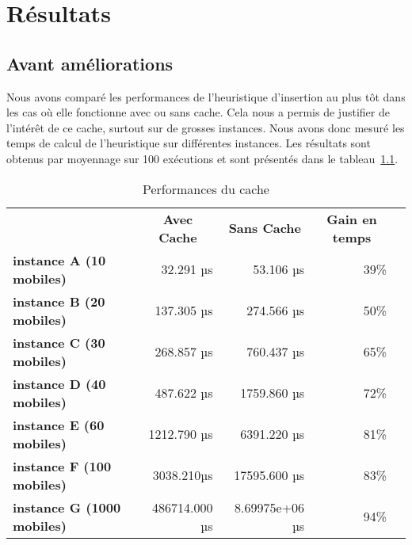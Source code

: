 \chapter{Résultats}
    \section{Avant améliorations}
        Nous avons comparé les performances de l'heuristique d'insertion au plus tôt dans les cas où elle fonctionne avec ou sans cache. Cela nous a permis de justifier de l'intérêt de ce cache, surtout sur de grosses instances. Nous avons donc mesuré les temps de calcul de l'heuristique sur différentes instances. Les résultats sont obtenus par moyennage sur 100 exécutions et sont présentés dans le tableau~\ref{tab:cache-perf}.

        \begin{table}[H]
            \centering
            \begin{tabular}{l|r|r|r|l}
            \cline{2-4}
                                                                     & \multicolumn{1}{c|}{\textbf{Avec Cache}} & \multicolumn{1}{c|}{\textbf{Sans Cache}} & \multicolumn{1}{c|}{\textbf{Gain en temps}} &  \\ \cline{1-4}
            \multicolumn{1}{|l|}{\textbf{instance A (10 mobiles)}}   & 32.291 µs                               & 53.106 µs                               & 39\%                               &  \\ \cline{1-4}
            \multicolumn{1}{|l|}{\textbf{instance B (20 mobiles)}}   & 137.305 µs                               & 274.566 µs                               & 50\%                               &  \\ \cline{1-4}
            \multicolumn{1}{|l|}{\textbf{instance C (30 mobiles)}}   & 268.857 µs                               & 760.437 µs                               & 65\%                               &  \\ \cline{1-4}
            \multicolumn{1}{|l|}{\textbf{instance D (40 mobiles)}}   & 487.622 µs                               & 1759.860 µs                               & 72\%                               &  \\ \cline{1-4}
            \multicolumn{1}{|l|}{\textbf{instance E (60 mobiles)}}   & 1212.790 µs                               & 6391.220 µs                               & 81\%                               &  \\ \cline{1-4}
            \multicolumn{1}{|l|}{\textbf{instance F (100 mobiles)}}  & 3038.210µs                                & 17595.600 µs                               & 83\%                               &  \\ \cline{1-4}
            \multicolumn{1}{|l|}{\textbf{instance G (1000 mobiles)}} & 486714.000 µs                                & 8.69975e+06 µs                           & 94\%                               &  \\ \cline{1-4}
            \end{tabular}
            \caption{Performances du cache}
            \label{tab:cache-perf}
        \end{table}
    	
